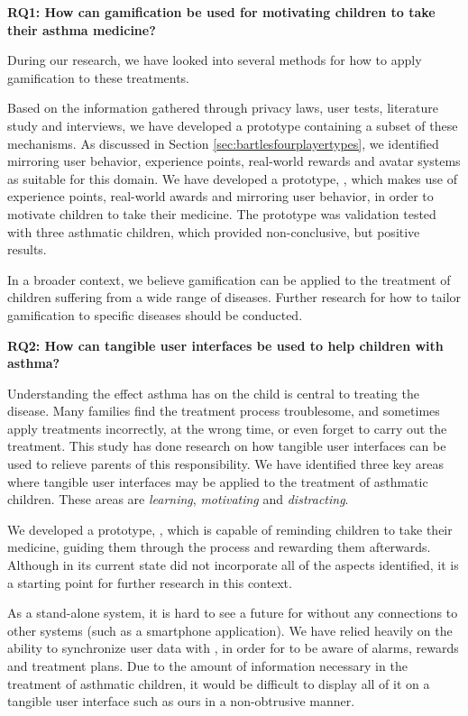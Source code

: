 \textbf{RQ1: How can gamification be used for motivating children to take their asthma medicine?}

During our research, we have looked into several methods for how to apply gamification to these treatments. 

Based on the information gathered through privacy laws, user tests, literature study and interviews, we have developed a prototype containing a subset of these mechanisms. As discussed in Section \ref{sec:bartlesfourplayertypes}, we identified mirroring user behavior, experience points, real-world rewards and avatar systems as suitable for this domain. We have developed a prototype, \app{}, which makes use of experience points, real-world awards and mirroring user behavior, in order to motivate children to take their medicine. The prototype was validation tested with three asthmatic children, which provided non-conclusive, but positive results.

In a broader context, we believe gamification can be applied to the treatment of children suffering from a wide range of diseases. Further research for how to tailor gamification to specific diseases should be conducted.  

\textbf{RQ2: How can tangible user interfaces be used to help children with asthma?}

Understanding the effect asthma has on the child is central to treating the disease. Many families find the treatment process troublesome, and sometimes apply treatments incorrectly, at the wrong time, or even forget to carry out the treatment. This study has done research on how tangible user interfaces can be used to relieve parents of this responsibility. 
We have identified three key areas where tangible user interfaces may be applied to the treatment of asthmatic children. These areas are \emph{learning}, \emph{motivating} and \emph{distracting}. 

We developed a prototype, \ab{}, which is capable of reminding children to take their medicine, guiding them through the process and rewarding them afterwards. Although \ab{} in its current state did not incorporate all of the aspects identified, it is a starting point for further research in this context.   

As a stand-alone system, it is hard to see a future for \ab{} without any connections to other systems (such as a smartphone application). We have relied heavily on the ability to synchronize user data with \app{}, in order for \ab{} to be aware of alarms, rewards and treatment plans. Due to the amount of information necessary in the treatment of asthmatic children, it would be difficult to display all of it on a tangible user interface such as ours in a non-obtrusive manner.  


